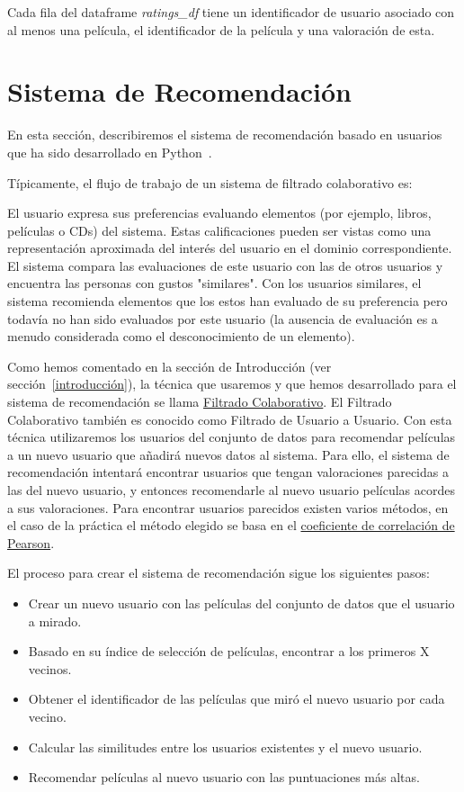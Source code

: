 \documentclass{uimppracticas}
\begin{document}
Cada fila del dataframe \textit{ratings\_df} tiene un identificador de usuario asociado con al menos una película, el identificador de la película y una valoración de esta. 

\newpage

\section{Sistema de Recomendación}\label{sistema_recomendacion}

En esta sección, describiremos el sistema de recomendación basado en usuarios que ha sido desarrollado en Python~\cite{GitHubRepo}.

Típicamente, el flujo de trabajo de un sistema de filtrado colaborativo es:

El usuario expresa sus preferencias evaluando elementos (por ejemplo, libros, películas o CDs) del sistema. Estas calificaciones pueden ser vistas como una representación aproximada del interés del usuario en el dominio correspondiente.
El sistema compara las evaluaciones de este usuario con las de otros usuarios y encuentra las personas con gustos "similares".
Con los usuarios similares, el sistema recomienda elementos que los estos han evaluado de su preferencia pero todavía no han sido evaluados por este usuario (la ausencia de evaluación es a menudo considerada como el desconocimiento de un elemento).

Como hemos comentado en la sección de Introducción (ver sección~\ref{introducción}), la técnica que usaremos y que hemos desarrollado para el sistema de recomendación se llama \href{https://es.wikipedia.org/wiki/Filtrado_colaborativo}{Filtrado Colaborativo}. El Filtrado Colaborativo también es conocido como Filtrado de Usuario a Usuario. Con esta técnica utilizaremos los usuarios del conjunto de datos para recomendar películas a un nuevo usuario que añadirá nuevos datos al sistema. Para ello, el sistema de recomendación intentará encontrar usuarios que tengan valoraciones parecidas a las del nuevo usuario, y entonces recomendarle al nuevo usuario películas acordes a sus valoraciones. Para encontrar usuarios parecidos existen varios métodos, en el caso de la práctica el método elegido se basa en el \href{https://es.wikipedia.org/wiki/Coeficiente_de_correlaci\%C3\%B3n_de_Pearson}{coeficiente de correlación de Pearson}. 

El proceso para crear el sistema de recomendación sigue los siguientes pasos:

\begin{itemize}
	\item Crear un nuevo usuario con las películas del conjunto de datos que el usuario a mirado.
	\item Basado en su índice de selección de películas, encontrar a los primeros X vecinos.
	\item Obtener el identificador de las películas que miró el nuevo usuario por cada vecino.
	\item Calcular las similitudes entre los usuarios existentes y el nuevo usuario.
	\item Recomendar películas al nuevo usuario con las puntuaciones más altas.
\end{itemize}
\end{document}
